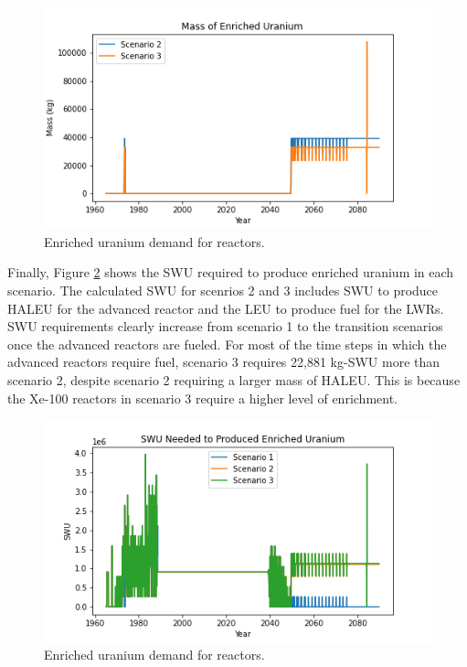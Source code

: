 \begin{figure}[ht]
    \centering
    \includegraphics[scale=0.5]{figures/enrichedU_advancedrx.png}
    \caption{Enriched uranium demand for reactors.}
    \label{fig:enriched_u}
\end{figure}

Finally, Figure \ref{fig:swu} shows the \gls{SWU} required to 
produce enriched uranium in each scenario. The calculated 
\gls{SWU} for scenrios 2 and 3 includes \gls{SWU} to 
produce \gls{HALEU} for the advanced reactor and the \gls{LEU}
to produce fuel for the \gls{LWR}s. \gls{SWU} requirements 
clearly increase from scenario 1 to the 
transition scenarios once the advanced reactors are fueled. 
For most of the time steps in which the advanced reactors 
require fuel, scenario 3 requires 22,881 kg-SWU 
more than scenario 2, despite scenario 2 requiring a larger 
mass of \gls{HALEU}. This is because the Xe-100 reactors 
in scenario 3 require a higher level of enrichment.  

\begin{figure}[ht]
    \centering
    \includegraphics[scale=0.5]{figures/swu_all.png}
    \caption{Enriched uranium demand for reactors.}
    \label{fig:swu}
\end{figure}